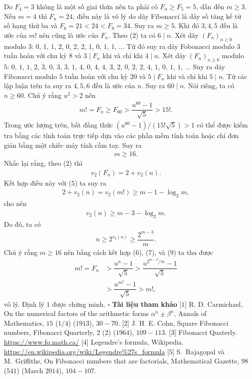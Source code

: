 \begin{multicols}{2}
	Do $F_4=3$ không là một số giai thừa nên ta phải có $F_n\geq F_5 =5$, dẫn đến $m\geq 3$. Nếu $m=4$ thì $F_n=24$, điều này là vô lý do dãy Fibonacci là dãy số tăng kể từ số hạng thứ ba và $F_8=21< 24< F_9=34$. Suy ra $m\geq 5$. Khi đó $3,4,5$ đều là ước của $m!$ nên cũng là ước của $F_n$. Theo ($2$) ta có $6\mid n$. 
	\vskip 0.1cm	
	Xét dãy $(F_n)_{n\geq 0}$  modulo $3$: $0$, $1$, $1$, $2$, $0$, $2$, $2$, $1$, $0$, $1$, $1$, $...$ Từ đó suy ra dãy Fobonacci modulo $3$ tuần hoàn với chu kỳ $8$ và $3\mid F_n$ khi và chỉ khi $4\mid n$.
	\vskip 0.1cm
	Xét dãy $(F_n)_{n\geq 0}$ modulo $5$:
	$0$, $1$, $1$, $2$, $3$, $0$, $3$, $3$, $1$, $4$, $0$, $4$, $4$, $3$, $2$, $0$, $2$, $2$, $4$, $1$, $0$, $1$, $1$, $...$
	Suy ra dãy Fibonacci modulo $5$ tuần hoàn với chu kỳ $20$ và $5\mid F_n$ khi và chỉ khi $5\mid n$. 
	\vskip 0.1cm	
	Từ các lập luận trên ta suy ra $4,5,6$ đều là ước của $n$. Suy ra $60\mid n$. Nói riêng, ta có $n\geq 60$. Chú ý rằng $u^2>2$ nên
	\begin{align*}
		m!=F_n\geq F_{60}>\dfrac{u^{60}-1}{\sqrt{5}}>15!.
	\end{align*}
	Trong ước lượng trên, bất đẳng thức $(u^{60}-1)/(15!\sqrt{5})>1$ có thể được kiểm tra bằng các tính toán trực tiếp dựa vào các phần mềm tính toán hoặc chỉ đơn giản bằng một chiếc máy tính cầm tay.
	Suy ra 
	\begin{align*}
		m\geq 16.
	\end{align*} 
	Nhắc lại rằng, theo ($2$) thì
	\begin{align*}
		v_2(F_n)=2+v_2(n).
	\end{align*}
	Kết hợp điều này với ($5$) ta suy ra 
	\begin{align*}
		2+v_2(n)= v_2(m!)\geq m-1-\log_2 m,
	\end{align*}
	cho nên 
	\begin{align*}
		v_2(n)\geq m-3-\log_2 m.
	\end{align*}
	Do đó, ta có 
	\begin{align*}
			n\geq 2^{v_2(n)}\geq  \dfrac{2^{m-3}}{m}. \tag{$9$}
	\end{align*}
	Chú ý rằng $m\geq 16$ nên bằng cách kết hợp ($6$), ($7$), và ($9$) ta thu được
	\begin{align*}
		m!=F_n&>\dfrac{u^n-1}{\sqrt{5}}>\dfrac{u^{2^{m-3}/{m}}-1}{\sqrt{5}}\\&>\dfrac{u^{m^2}-1}{\sqrt{5}}>m!,
	\end{align*}
	vô lý. Định lý $1$ được chứng minh. \hfill $\square$
	\vskip 0.1cm
	\textbf{\color{hoccungpi}Tài liệu tham khảo}
	\vskip 0.1cm
	[$1$] R. D. Carmichael, On the numerical factors of the arithmetic forms $\alpha^n\pm \beta^n$, Annals of Mathematics, $15$ ($1/4$) ($1913$), $30-70$.
	\vskip 0.1cm
	[$2$] J. H. E. Cohn, Square Fibonacci numbers, Fibonacci Quarterly, $2$ ($2$)
		($1964$), $109-113$.
	\vskip 0.1cm
	[$3$] Fibonacci Quaterly. \url{https://www.fq.math.ca/}
	\vskip 0.1cm
	[$4$] Legendre's formula, Wikipedia. \url{https://en.wikipedia.org/wiki/Legendre%27s_formula}
	\vskip 0.1cm
	[$5$] S.~Rajagopal và M.~Griffiths,  On Fibonacci numbers that are factorials, Mathematical Gazette, {$98$} ($541$) (March $2014$), $104-107$.
\end{multicols}